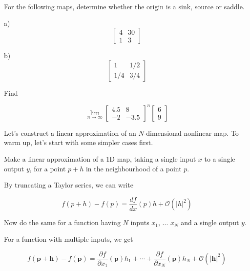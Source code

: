 \begin{exer}
For the following maps, determine whether the origin is a sink, source or saddle.

a) $$\begin{bmatrix}4 & 30 \\ 1 & 3 \end{bmatrix}$$

b) $$\begin{bmatrix}1 & 1/2 \\ 1/4 & 3/4 \end{bmatrix}$$

\end{exer}


\begin{exer}
Find

$$\lim_{n \to \infty}\begin{bmatrix}4.5 & 8 \\ -2 & -3.5 \end{bmatrix} ^ n \begin{bmatrix} 6 \\ 9 \end{bmatrix}$$

\end{exer}


\pagebreak


Let's construct a linear approximation of an $N$-dimensional nonlinear map. To warm up, let's start with some simpler cases first.

\begin{cue}
Make a linear approximation of a 1D map, taking a single input $x$ to a single output $y$, for a point $p+h$ in the neighbourhood of a point $p$.  
\end{cue}

By truncating a Taylor series, we can write

\begin{equation}
f(p+h) - f(p) = \frac{df}{dx}(p)h + \mathcal{O}\left(|h|^2\right)
\end{equation} 

\begin{cue}
Now do the same for a function having $N$ inputs $x_1$, ... $x_N$ and a single output $y$.  
\end{cue}

For a function with multiple inputs, we get

\begin{equation}
  f(\mathbf{p}+\mathbf{h}) - f(\mathbf{p}) = \frac{\partial f}{\partial x_1}(\mathbf p)h_1+ \cdots +  \frac{\partial f}{\partial x_N}(\mathbf p)h_N+ \mathcal{O}\left(|\mathbf{h}|^2\right)
  \label{eq-multivar-approx}
\end{equation} 

